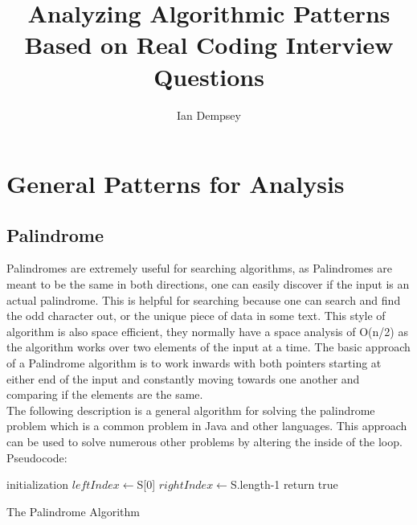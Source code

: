 \documentclass[10pt,twocolumn]{IEEEtran}
\title{Analyzing Algorithmic Patterns Based on Real Coding Interview Questions}
\author{Ian Dempsey}
\begin{document}
\maketitle
{}
\newpage
{}

\section{General Patterns for Analysis}
\subsection{Palindrome}
Palindromes are extremely useful for searching algorithms, as Palindromes are meant to be the same in both directions, one can easily discover if the input is an actual palindrome. This is helpful for searching because one can search and find the odd character out, or the unique piece of data in some text. This style of algorithm is also space efficient, they normally have a space analysis of O(n/2) as the algorithm works over two elements of the input at a time. The basic approach of a Palindrome algorithm is to work inwards with both pointers starting at either end of the input and constantly moving towards one another and comparing if the elements are the same.\\  
The following description is a general algorithm for solving the palindrome problem which is a common problem in Java and other languages. This approach can be used to solve numerous other problems by altering the inside of the loop.
Pseudocode:
\IncMargin{1em}
\begin{algorithm}
	\SetAlgoLined
	initialization\;
	$leftIndex  \longleftarrow $S[0]\;
	$rightIndex \longleftarrow $S.length-1\;
return true\;
\caption{The Palindrome Algorithm}
\end{algorithm}\DecMargin{1em}
\end{document}
